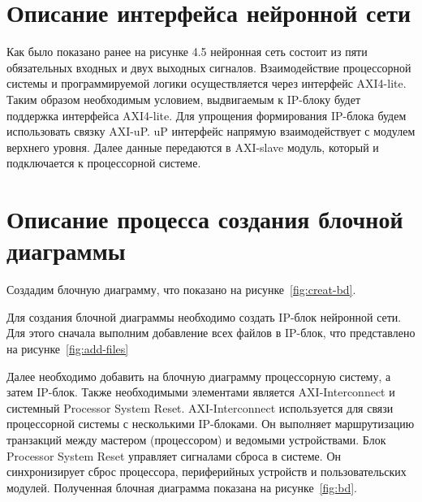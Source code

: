 \section{Описание интерфейса нейронной сети}

\hspace*{12.5 mm}Как было показано ранее на рисунке 4.5 нейронная сеть состоит
из пяти обязательных входных и двух выходных сигналов. 
Взаимодействие процессорной системы и программируемой логики 
осуществляется через интерфейс AXI4-lite. Таким образом 
необходимым условием, выдвигаемым к IP-блоку будет поддержка 
интерфейса AXI4-lite. Для упрощения формирования IP-блока 
будем использовать связку AXI-uP. uP интерфейс напрямую 
взаимодействует с модулем верхнего уровня. Далее данные 
передаются в AXI-slave модуль, который и подключается к 
процессорной системе.

\section{Описание процесса создания блочной диаграммы}
\hspace*{12.5 mm}Создадим блочную диаграмму, что показано на
рисунке~\ref{fig:creat-bd}.


Для создания блочной диаграммы необходимо создать IP-блок нейронной сети. Для 
этого сначала выполним добавление всех файлов в IP-блок, что представлено на 
рисунке~\ref{fig:add-files}


Далее необходимо добавить на блочную диаграмму процессорную систему, а затем 
IP-блок. Также необходимыми элементами является AXI-Interconnect и системный 
Processor System Reset. AXI-Interconnect используется для связи процессорной 
системы с несколькими IP-блоками. Он выполняет маршрутизацию транзакций между 
мастером (процессором) и ведомыми устройствами. Блок Processor System Reset 
управляет сигналами сброса в системе. Он синхронизирует сброс процессора, 
периферийных устройств и пользовательских модулей. Полученная блочная диаграмма
показана на рисунке~\ref{fig:bd}.


